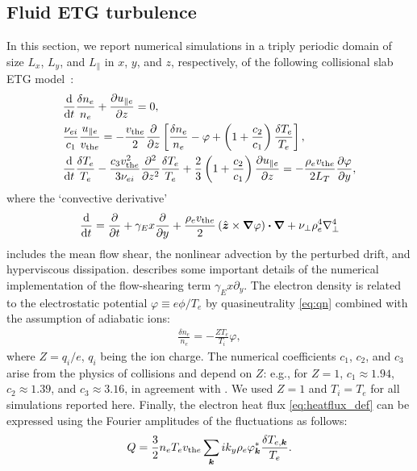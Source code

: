 \documentclass{jpp}
\newcommand{\phinorm}{\varphi}
\newcommand{\gammaE}{\gamma_{E}}
\begin{document}
\subsection{Fluid ETG turbulence}
\label{sec:ETG}


In this section, we report numerical simulations in a triply periodic domain of size \(L_x\), \(L_y\), and \(L_\parallel\) in \(x\), \(y\), and \(z\), respectively, of the following collisional slab ETG model~\citep{adkins23}:
\begin{align}
	&\frac{\text{d}}{\text{d} t} \frac{\delta n_e}{n_{e}} + \frac{\partial u_{\parallel e}}{\partial z} = 0, \label{eq:phi} \\
	&\frac{\nu_{ei}}{c_1}\frac{u_{\parallel e}}{v_{\text{th}e}} = -\frac{v_{\text{th}e}}{2} \frac{\partial}{\partial z}\left[ \frac{\delta n_e}{n_{e}} - \varphi + \left(1 + \frac{c_2}{c_1}\right)\frac{\delta T_e}{T_{e}} \right], \label{eq:u}\\
	&\frac{\text{d}}{\text{d} t}\frac{\delta T_e}{T_{e}} - \frac{c_3v_{\text{th}e}^2}{3\nu_{ei}}\frac{\partial^2}{\partial z^2} \frac{\delta T_e}{T_{e}} + \frac{2}{3} \left(1 + \frac{c_2}{c_1}\right)\frac{\partial u_{\parallel e}}{\partial z} = -\frac{\rho_e v_{\text{th}e}}{2 L_T}\frac{\partial \varphi}{\partial y}, 
	\label{eq:T}
\end{align}
where the `convective derivative'
\begin{equation}
	\frac{\rmd}{\rmd t} = \frac{\partial}{\partial t} + \gammaE x \frac{\partial}{\partial y} + \frac{\rhoe\vthe}{2} \left(\hat{\vec{z}} \times \grad \varphi\right)\bcdot\grad + \nu_\perp \rhoe^4 \nabla_\perp^4
\end{equation}
includes the mean flow shear, the nonlinear advection by the perturbed \mbox{\exb{}} drift, and hyperviscous dissipation.  describes some important details of the numerical implementation of the flow-shearing term \(\gammaE x \partial_y\). The electron density is related to the electrostatic potential $\phinorm \equiv e \phi / T_{e}$ by quasineutrality \cref{eq:qn} combined with the assumption of adiabatic ions:
\begin{align}
	\frac{\delta n_e}{n_{e}} = - \frac{Z T_{e}}{T_{i}} \phinorm,
	\label{eq:qn_etg}
\end{align}
where \(Z = q_i / e\), \(q_i\) being the ion charge. The numerical coefficients \(c_1\), \(c_2\), and \(c_3\) arise from the physics of collisions and depend on \(Z\): e.g., for \(Z = 1\), \(c_1 \approx 1.94\), \(c_2 \approx 1.39\), and \(c_3\approx3.16\), in agreement with \citep{braginskii65}. We used \(Z = 1\) and \(T_{i} = T_{e}\) for all simulations reported here. Finally, the electron heat flux \cref{eq:heatflux_def} can be expressed using the Fourier amplitudes of the fluctuations as follows:
\begin{equation}
	Q = \frac{3}{2} n_{e}T_{e}v_{\text{th}e} \sum_{\boldsymbol{k}} i k_y\rho_e \varphi_{\boldsymbol{k}}^* \frac{\delta T_{e,{\boldsymbol{k}}}}{T_{e}}.
\end{equation}
\end{document}

